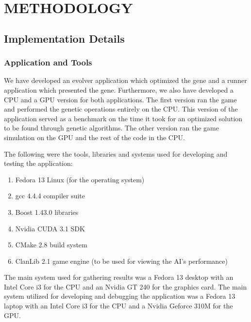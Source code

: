 \chapter{METHODOLOGY}
%
%
\section{Implementation Details}

\subsection{Application and Tools}
We have developed an evolver application which optimized the gene and a runner
application which presented the gene. Furthermore, we also have developed a CPU and
a GPU version for both applications. The first version ran the game and performed 
the genetic operations entirely on the CPU. This version of the application served 
as a benchmark on the time it took for an optimized solution to be found through 
genetic algorithms. The other version ran the game simulation on the GPU and 
the rest of the code in the CPU.


The following were the tools, libraries and systems used for developing and testing
the application:

\begin{enumerate}
  \item Fedora 13 Linux (for the operating system)
  \item gcc 4.4.4 compiler suite
  \item Boost 1.43.0 libraries
  \item Nvidia CUDA 3.1 SDK
  \item CMake 2.8 build system
  \item ClanLib 2.1 game engine (to be used for viewing the AI's performance)
\end{enumerate}

The main system used for gathering results was a Fedora 13 desktop with an 
Intel Core i3 for the CPU and an Nvidia GT 240 for the graphics card. The 
main system utilized for developing and debugging the application was a 
Fedora 13 laptop with an Intel Core i3 for the CPU and a Nvidia Geforce 
310M for the GPU.


